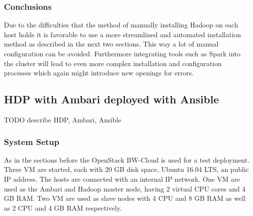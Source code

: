 \subsubsection{Conclusions}

Due to the difficulties that the method of manually installing Hadoop on each host holds it is favorable to use a more streamlined 
and automated installation method as described in the next two sections.
This way a lot of manual configuration can be avoided.
Furthermore integrating tools such as Spark into the cluster 
will lead to even more complex installation and configuration processes which again might introduce new openings for errors.

\subsection{\acl{HDP} with Ambari deployed with Ansible}
\label{sec:design:hdp_ambari_ansible}
TODO describe HDP, Ambari, Ansible

\subsubsection{System Setup}

As in the sections before the OpenStack BW-Cloud is used for a test deployment.
Three \acs{VM} are started, each with 20 \ac{GB} disk space, Ubuntu 16.04 \ac{LTS}, an public \ac{IP} address. 
The hosts are connected with an internal \ac{IP} network.
One \ac{VM} are used as the Ambari and Hadoop master node, having 2 virtual \ac{CPU} cores and 4 \ac{GB} \ac{RAM}.
Two \acs{VM} are used as slave nodes with 4 \acs{CPU} and 8 \ac{GB} \ac{RAM} as well as 2 \acs{CPU} and 4 \ac{GB} \ac{RAM} respectively.

